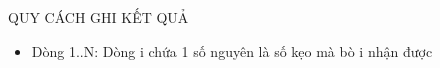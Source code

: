 QUY CÁCH GHI KẾT QUẢ  
\begin{itemize}
	\item     Dòng 1..N: Dòng i chứa 1 số nguyên là số kẹo mà bò i nhận được   
\end{itemize}
